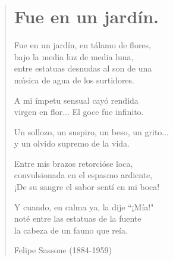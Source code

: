 \documentclass[12pt, twoside]{book}
\begin{document}
\begin{verse}
\begin{center}
\section{Fue en un jardín.}
\end{center}

Fue en un jardín, en tálamo de flores,\\
bajo la media luz de media luna,\\
entre estatuas desnudas al son de una \\
música de agua de los surtidores.\newline

A mi ímpetu sensual cayó rendida\\
virgen en flor... El goce fue infinito.\newline

Un sollozo, un suspiro, un beso, un grito...\\
y un olvido supremo de la vida.\newline

Entre mis brazos retorcióse loca,\\
convulsionada en el espasmo ardiente,\\
¡De su sangre el sabor sentí en mi boca!\newline

Y cuando, en calma ya, la dije ``¡Mía!"\\
noté entre las estatuas de la fuente\\
la cabeza de un fauno que reía.\newline

Felipe Sassone (1884-1959)

\end{verse}
\newpage
\end{document}
